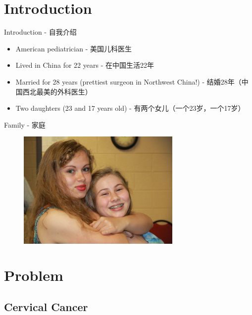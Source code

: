 \section{Introduction}\label{introduction}

\frame{\tableofcontents[hidesubsections]}

\begin{frame}{Introduction - 自我介绍}

\begin{itemize}
\itemsep1pt\parskip0pt
\item
  American pediatrician - 美国儿科医生
\item
  Lived in China for 22 years - 在中国生活22年
\item
  Married for 28 years (prettiest surgeon in Northwest China!) -
  结婚28年（中国西北最美的外科医生）
\item
  Two daughters (23 and 17 years old) - 有两个女儿（一个23岁，一个17岁）
\end{itemize}

\end{frame}

\begin{frame}{Family - 家庭}

\begin{figure}
\includegraphics[scale=0.7]{./img/img_0002_300.jpg}
\end{figure}

\end{frame}

\section{Problem}\label{problem}

\subsection{Cervical Cancer}\label{cervical-cancer}

